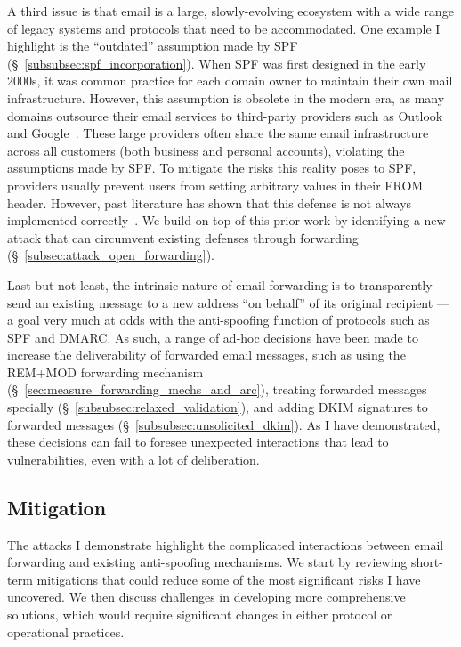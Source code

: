 A third issue is that email is a large, slowly-evolving ecosystem with a wide range of legacy systems and protocols that need to be accommodated.
One example I highlight is the ``outdated'' assumption made by SPF (\S~\ref{subsubsec:spf_incorporation}). When SPF was first designed in the early 2000s, it was common practice for each domain owner to maintain their own mail infrastructure. However, this assumption is obsolete in the modern era, as many domains outsource their email services to third-party providers such as Outlook and Google~\cite{liu2021s}. These large providers often share the same email infrastructure across all customers (both business and personal accounts), violating the assumptions made by SPF. 
To mitigate the risks this reality poses to SPF, providers 
usually prevent users from setting arbitrary values in their FROM header. However, past literature has shown that this defense is not always implemented correctly~\cite{chen2020composition}. We build on top of this prior work by identifying a new attack that can circumvent existing defenses through forwarding (\S~\ref{subsec:attack_open_forwarding}).

Last but not least, the intrinsic nature of email forwarding is to transparently send an existing message to a new address ``on behalf'' of its original recipient --- a goal very much at odds with the anti-spoofing function of protocols such as SPF and DMARC. As such, a range of ad-hoc decisions have been made to increase the deliverability of forwarded email messages, such as using the REM+MOD forwarding mechanism (\S~\ref{sec:measure_forwarding_mechs_and_arc}), treating forwarded messages specially (\S~\ref{subsubsec:relaxed_validation}), and adding DKIM signatures to forwarded messages (\S~\ref{subsubsec:unsolicited_dkim}). As I have demonstrated, 
these decisions can fail to foresee unexpected interactions that lead to vulnerabilities, even with a lot of deliberation.

\subsection{Mitigation}
The attacks I demonstrate highlight the complicated interactions
between email forwarding and existing anti-spoofing mechanisms. We start by reviewing short-term mitigations that could reduce some of the most significant risks I have uncovered. We then discuss challenges in developing more comprehensive solutions, which would require significant changes in either
protocol or operational practices.

